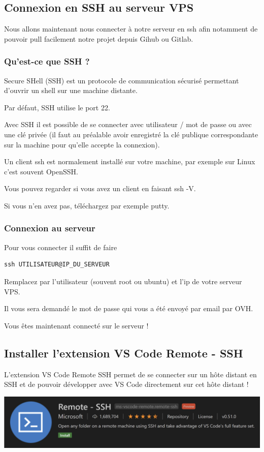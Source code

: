 \documentclass{article}
\begin{document}
\subsection{Connexion en SSH au serveur VPS}
Nous allons maintenant nous connecter à notre serveur en ssh afin notamment de pouvoir pull facilement notre projet depuis Gihub ou Gitlab.

\subsubsection{Qu'est-ce que SSH ?}
Secure SHell (SSH) est un protocole de communication sécurisé permettant d'ouvrir un shell sur une machine distante.

Par défaut, SSH utilise le port 22.

Avec SSH il est possible de se connecter avec utilisateur / mot de passe ou avec une clé privée (il faut au préalable avoir enregistré la clé publique correspondante sur la machine pour qu'elle accepte la connexion).

Un client ssh est normalement installé sur votre machine, par exemple sur Linux c'est souvent OpenSSH.

Vous pouvez regarder si vous avez un client en faisant ssh -V.

Si vous n'en avez pas, téléchargez par exemple putty.

\subsubsection{Connexion au serveur}
Pour vous connecter il suffit de faire
\begin{verbatim}
ssh UTILISATEUR@IP_DU_SERVEUR
\end{verbatim}

Remplacez par l'utilisateur (souvent root ou ubuntu) et l'ip de votre serveur VPS.

Il vous sera demandé le mot de passe qui vous a été envoyé par email par OVH.

Vous êtes maintenant connecté sur le serveur !

\subsection{Installer l'extension VS Code Remote - SSH}
L'extension VS Code Remote SSH permet de se connecter sur un hôte distant en SSH et de pouvoir développer avec VS Code directement sur cet hôte distant !
\begin{center}
\includegraphics[width=15cm]{images/image9.png}
\end{center}
\end{document}
